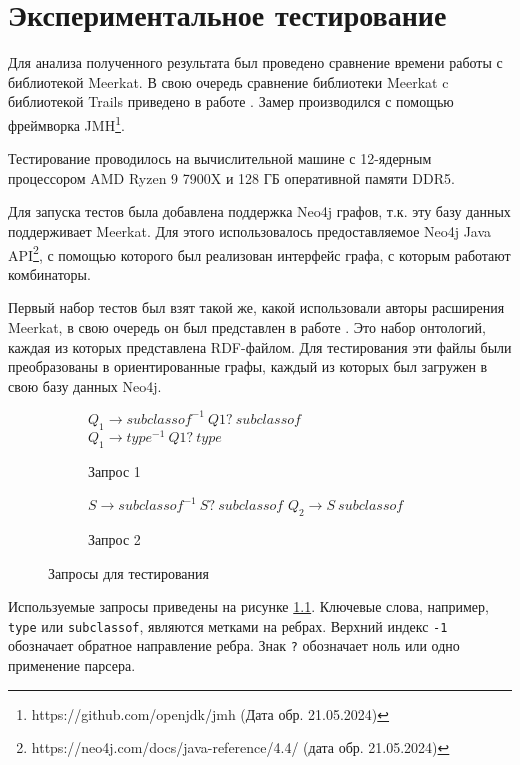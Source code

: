 \chapter{Экспериментальное тестирование}
\label{ch:ch4}


Для анализа полученного результата был проведено сравнение времени работы с библиотекой Meerkat. В свою очередь сравнение библиотеки Meerkat c библиотекой Trails приведено в работе \cite{MeerkatGraphs}. Замер производился с помощью фреймворка JMH\footnote{https://github.com/openjdk/jmh (Дата обр. 21.05.2024)}.

Тестирование проводилось на вычислительной машине с 12-ядерным процессором AMD Ryzen 9 7900X и 128 ГБ оперативной памяти DDR5.

Для запуска тестов была добавлена поддержка Neo4j графов, т.к. эту базу данных поддерживает Meerkat. Для этого использовалось предоставляемое Neo4j Java API\footnote{https://neo4j.com/docs/java-reference/4.4/ (дата обр. 21.05.2024)}, с помощью которого был реализован интерфейс графа, с которым работают комбинаторы.

Первый набор тестов был взят такой же, какой использовали авторы расширения Meerkat, в свою очередь он был представлен в работе \cite{RDF_CF}. Это набор онтологий, каждая из которых представлена RDF-файлом. Для тестирования эти файлы были преобразованы в ориентированные графы, каждый из которых был загружен в свою базу данных Neo4j.

\begin{figure}[htp]
    \centering
    \begin{subfigure}[b]{0.49\textwidth}
        \centering
        $Q_1 \to subclassof^{-1}\ Q1?\ subclassof$\\
        $Q_1 \to type^{-1}\ Q1?\ type$\\
        \caption{Запрос 1}
    \end{subfigure}
    \hfill
    \begin{subfigure}[b]{0.49\textwidth}
        \centering
        $S \to subclassof^{-1}\ S?\ subclassof$
        $Q_2 \to S\ subclassof$
        \caption{Запрос 2}
    \end{subfigure}
    \caption{Запросы для тестирования}
    \label{fig:queries}
\end{figure}

Используемые запросы приведены на рисунке \ref{fig:queries}. Ключевые слова, например, \texttt{type} или \texttt{subclassof}, являются метками на ребрах. Верхний индекс \texttt{-1} обозначает обратное направление ребра. Знак \texttt{?} обозначает ноль или одно применение парсера.

